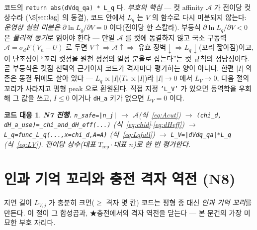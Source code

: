 \documentclass[11pt,a4paper]{article}
\newtheorem*{codebox}{코드 대응}
\newcommand{\rep}{\mathrm{rep}}
\newcommand{\code}[1]{\texttt{#1}}
\begin{document}
코드의 \code{return abs(dVdq\_qa) * L\_q} 다. \emph{부호의 핵심} — 컷 affinity $\mathcal A$ 가 전이당 컷 상수라
($\S\ref{sec:lag}$ 의 동결), 코드 안에서 $L_q$ 는 $V$ 의 함수로 다시 미분되지 않는다: \emph{운영상 실현 미분은}
$\partial\ln L_q/\partial V=0$ 이다(전이당 한 스칼라). 부등식 $\partial\ln L_q/\partial V<0$ 은 \emph{물리적 동기}로 읽어야
한다 — 만일 $\mathcal A$ 를 컷에 동결하지 않고 국소 구동력 $\mathcal A=\sigma_dF(V_n-U)$ 로 두면 $V\!\uparrow\Rightarrow
\mathcal A\!\uparrow\Rightarrow$ 유효 장벽$\downarrow\Rightarrow L_q\downarrow$(꼬리 짧아짐)이고, 이 단조성이 ``꼬리 컷점을
원천 정점의 일정 분율로 잡는다''는 컷 규칙의 정당성이다. 곧 부등식은 컷점 선택의 근거이지 코드가 격자마다 평가하는 양이
아니다. 한편 $|I|$ 의존은 동결 뒤에도 살아 있다 — $L_q\propto|I|$($T_*\propto|I|$)라 $|I|\to0$
에서 $L_V\to0$, 다음 절의 꼬리가 사라지고 평형 peak 으로 환원된다. 직접 지정 \code{'L\_V'} 가 있으면 동역학을 우회해
그 값을 쓰고, $I\le0$ 이거나 \code{dH\_a} 키가 없으면 $L_V=0$ 이다.

\begin{codebox}
\textbf{N7 진행.} \code{n\_safe=|n\_j|} $\to$ $\mathcal A$(식~\eqref{eq:Acut}) $\to$
\code{(chi\_d, dH\_a\_use)=\_chi\_and\_dH\_eff(...)} (식~\eqref{eq:chid}$\cdot$\eqref{eq:dHeff}) $\to$
\code{L\_q=func\_L\_q(...,x=chi\_d,A=A)} (식~\eqref{eq:Lqfull}) $\to$ \code{L\_V=|dVdq\_qa|*L\_q} (식~\eqref{eq:LV}).
전이당 \emph{상수}(대표 $T_\rep\cdot$대표 $n$)로 한 번 평가한다.
\end{codebox}

\section{인과 기억 꼬리와 충전 격자 역전 (N8)}\label{sec:tail}
지연 길이 $L_{V,j}$ 가 충분히 크면($\ge$ 격자 몇 칸) 코드는 평형 종 대신 \emph{인과 기억 꼬리}를 만든다. 이 절이 그
합성곱과, ★충전에서의 격자 역전을 닫는다 — 본 문건의 가장 미묘한 부호 자리다.
\end{document}
